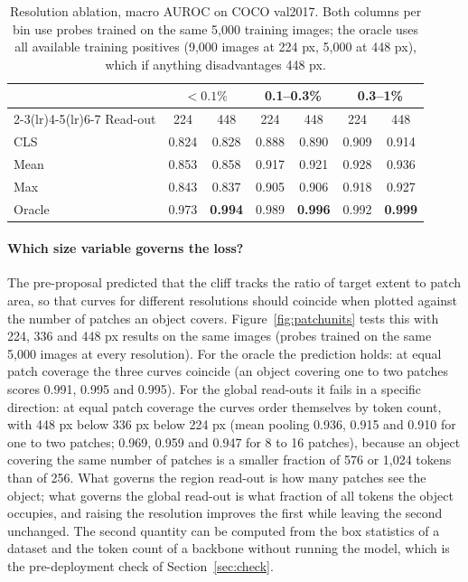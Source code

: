 \documentclass[10pt,letterpaper,twocolumn]{article}
\begin{document}
\begin{table}[t]
\centering\small
\caption{Resolution ablation, macro AUROC on COCO val2017. Both columns per bin use probes
trained on the same 5,000 training images; the oracle uses all available training positives
(9,000 images at 224 px, 5,000 at 448 px), which if anything disadvantages 448 px.}
\label{tab:resolution}
\begin{tabular}{l cc cc cc}
\toprule
 & \multicolumn{2}{c}{$<0.1\%$} & \multicolumn{2}{c}{0.1--0.3\%} & \multicolumn{2}{c}{0.3--1\%} \\
\cmidrule(lr){2-3}\cmidrule(lr){4-5}\cmidrule(lr){6-7}
Read-out & 224 & 448 & 224 & 448 & 224 & 448 \\
\midrule
CLS    & 0.824 & 0.828 & 0.888 & 0.890 & 0.909 & 0.914 \\
Mean   & 0.853 & 0.858 & 0.917 & 0.921 & 0.928 & 0.936 \\
Max    & 0.843 & 0.837 & 0.905 & 0.906 & 0.918 & 0.927 \\
\midrule
Oracle & 0.973 & \textbf{0.994} & 0.989 & \textbf{0.996} & 0.992 & \textbf{0.999} \\
\bottomrule
\end{tabular}
\end{table}

\paragraph{Which size variable governs the loss?}
The pre-proposal predicted that the cliff tracks the ratio of target extent to patch area, so
that curves for different resolutions should coincide when plotted against the number of
patches an object covers. Figure~\ref{fig:patchunits} tests this with 224, 336 and 448 px
results on the same images (probes trained on the same 5,000 images at every resolution).
For the oracle the prediction holds: at equal patch coverage the three curves coincide (an
object covering one to two patches scores 0.991, 0.995 and 0.995). For the global read-outs
it fails in a specific direction: at equal patch coverage the curves order themselves by
token count, with 448 px below 336 px below 224 px (mean pooling 0.936, 0.915 and 0.910 for
one to two patches; 0.969, 0.959 and 0.947 for 8 to 16 patches), because an object covering
the same number of patches is a smaller fraction of 576 or 1,024 tokens than of 256. What governs the region read-out is how many patches see the object;
what governs the global read-out is what fraction of all tokens the object occupies, and
raising the resolution improves the first while leaving the second unchanged. The second
quantity can be computed from the box statistics of a dataset and the token count of a
backbone without running the model, which is the pre-deployment check of
Section~\ref{sec:check}.
\end{document}
